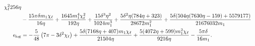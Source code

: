 \documentclass[%
aps,
prd,
amssymb,
amsmath,
amsfonts,
eqsecnum,
showpacs,
nofootinbib,
floatfix,
twocolumn,
twoside,
a4paper,
superscriptaddress
]{revtex4-1}
\begin{document}
\begin{widetext}
\begin{subequations}
\begin{align}
{   \chi _{\ell}^2}{256 \eta }\nonumber\\
   &-\frac{15 \pi  \delta  m_1 \chi _{\ell}}{16 \eta }+\frac{1645 m_1^4 \chi_{\ell}^2}{192 \eta }+\frac{15 \delta ^3 \eta ^2}{1024 m_1^3}+\frac{5
   \delta ^2 \eta  (784 \eta +323)}{28672 m_1^2}+\frac{5 \delta  (504 \eta  (7630 \eta -159)+5579177)}{21676032 m_1}\\
\epsilon_{\rm log} &= -\frac{5}{48} \left(7 \pi -3 \delta ^2 \chi _{\ell}\right)+\frac{5 \delta  (7168 \eta +407) m_1 \chi _{\ell}}{21504 \eta }+\frac{5 (4072 \eta +599) m_1^2 \chi _{\ell}}{9216
   \eta }-\frac{5 \pi  \delta }{16 m_1}.
   \label{eq:epsilon_coeff}
\end{align}
\end{subequations}
\end{widetext}

\end{document}
